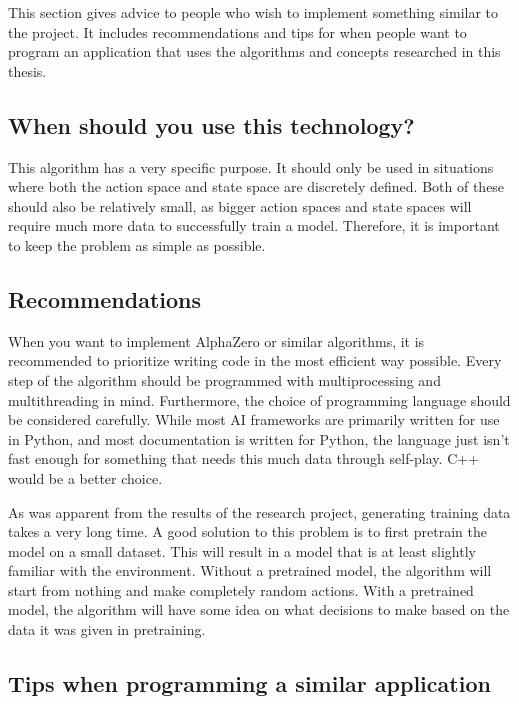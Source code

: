 \documentclass{article}
\begin{document}
This section gives advice to people who wish to implement something similar to the project.
It includes recommendations and tips for when people want to program an application that uses
the algorithms and concepts researched in this thesis.

\subsection{When should you use this technology?}

This algorithm has a very specific purpose. It should only be used in situations where
both the action space and state space are discretely defined. Both of these should also
be relatively small, as bigger action spaces and state spaces will require much more 
data to successfully train a model. 
Therefore, it is important to keep the problem as simple as possible. 

\subsection{Recommendations}

When you want to implement AlphaZero or similar algorithms, it is recommended to
prioritize writing code in the most efficient way possible. Every step of the algorithm
should be programmed with multiprocessing and multithreading in mind. Furthermore,
the choice of programming language should be considered carefully. While most AI 
frameworks are primarily written for use in Python, and most documentation is written
for Python, the language just isn't fast enough for something that needs this much data through self-play. 
C++ would be a better choice.

As was apparent from the results of the research project, generating training data 
takes a very long time. A good solution to this problem is to first pretrain the model
on a small dataset. This will result in a model that is at least slightly familiar 
with the environment. Without a pretrained model, the algorithm will start from nothing
and make completely random actions. With a pretrained model, the algorithm will have some 
idea on what decisions to make based on the data it was given in pretraining.


\subsection{Tips when programming a similar application}
\end{document}
